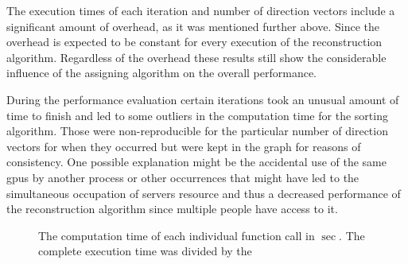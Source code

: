 The execution times of each iteration and number of direction vectors include a significant amount of overhead, as it was mentioned further above. Since the overhead is expected to be constant for every execution of the reconstruction algorithm. Regardless of the overhead these results still show the considerable influence of the assigning algorithm on the overall performance.

During the performance evaluation certain iterations took an unusual amount of time to finish and led to some outliers in the computation time for the sorting algorithm. Those were non-reproducible for the particular number of direction vectors for when they occurred but were kept in the graph for reasons of consistency. One possible explanation might be the accidental use of the same  \acp{gpu} by another process or other occurrences that might have led to the simultaneous occupation of servers resource and thus a decreased performance of the reconstruction algorithm since multiple people have access to it.


\begin{figure}[H]
    \centering
    \caption{The computation time of each individual function call in $\sec$. The complete execution time was divided by the   }
    \label{fig:computation_per_mex}
\end{figure}

